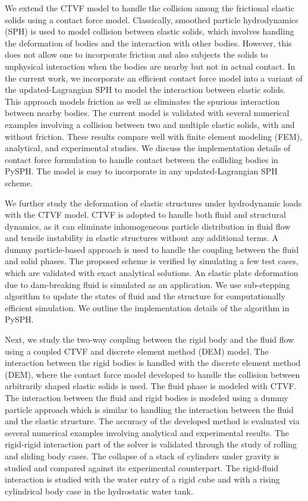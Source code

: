 \begin{Abstract}
  We extend the CTVF model to handle the collision among the frictional
  elastic solids using a contact force model. Classically, smoothed particle
  hydrodynamics (SPH) is used to model collision between elastic solids, which
  involves handling the deformation of bodies and the interaction with other
  bodies. However, this does not allow one to incorporate friction and also
  subjects the solids to unphysical interaction when the bodies are nearby but
  not in actual contact. In the current work, we incorporate an efficient
  contact force model into a variant of the updated-Lagrangian SPH to model the
  interaction between elastic solids. This approach models friction as well as
  eliminates the spurious interaction between nearby bodies. The current model
  is validated with several numerical examples involving a collision between two
  and multiple elastic solids, with and without friction. These results compare
  well with finite element modeling (FEM), analytical, and experimental studies.
  We discuss the implementation details of contact force formulation to handle contact
  between the colliding bodies in PySPH. The model is easy to incorporate in any
  updated-Lagrangian SPH scheme.


  We further study the deformation of elastic structures under hydrodynamic
  loads with the CTVF model. CTVF is adopted to handle both fluid and structural
  dynamics, as it can eliminate inhomogeneous particle distribution in fluid
  flow and tensile instability in elastic structures without any additional
  terms. A dummy particle-based approach is used to handle the coupling between
  the fluid and solid phases. The proposed scheme is verified by simulating a
  few test cases, which are validated with exact analytical solutions. An
  elastic plate deformation due to dam-breaking fluid is simulated as an
  application. We use sub-stepping algorithm to update the states of fluid and
  the structure for computationally efficient simulation. We outline the
  implementation details of the algorithm in PySPH.

  Next, we study the two-way coupling between the rigid body and the fluid flow
  using a coupled CTVF and discrete element method (DEM) model. The
  interaction between the rigid bodies is handled with the discrete element
  method (DEM), where the contact force model developed to handle the collision
  between arbitrarily shaped elastic solids is used. The fluid phase is modeled
  with CTVF. The interaction between the fluid and rigid bodies is modeled using
  a dummy particle approach which is similar to handling the interaction between
  the fluid and the elastic structure. The accuracy of the developed method is
  evaluated via several numerical examples involving analytical and experimental
  results. The rigid-rigid interaction part of the solver is validated through
  the study of rolling and sliding body cases. The collapse of a stack of
  cylinders under gravity is studied and compared against its experimental
  counterpart. The rigid-fluid interaction is studied with the water entry of a
  rigid cube and with a rising cylindrical body case in the hydrostatic water
  tank.


\end{Abstract}
